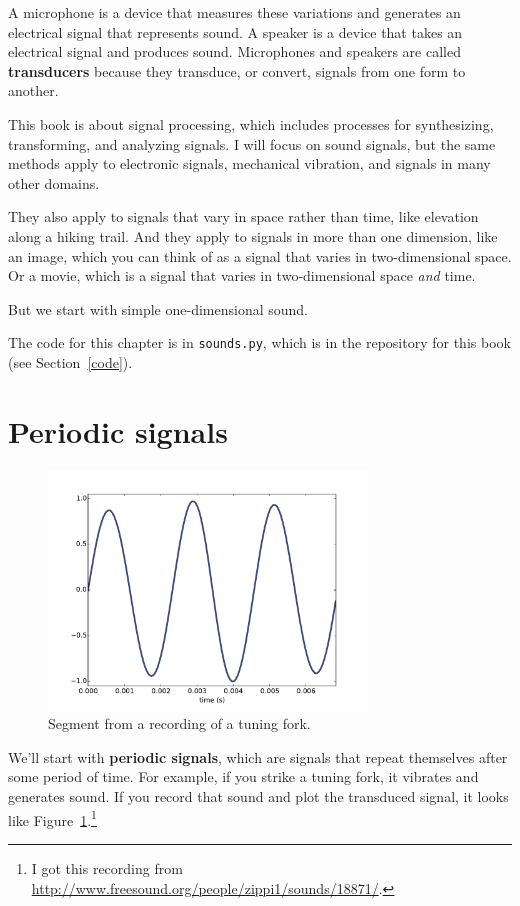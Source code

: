 \documentclass[12pt]{book}
\begin{document}
A microphone is a device that measures these variations and generates
an electrical signal that represents sound.  A speaker is a device
that takes an electrical signal and produces sound.
Microphones and speakers are called {\bf transducers} because they
transduce, or convert, signals from one form to another.

This book is about signal processing, which includes processes for
synthesizing, transforming, and analyzing signals.  I will focus on
sound signals, but the same methods apply to electronic signals,
mechanical vibration, and signals in many other domains.

They also apply to signals that vary in space rather than time, like
elevation along a hiking trail.  And they apply to signals in more
than one dimension, like an image, which you can think of as a signal
that varies in two-dimensional space.  Or a movie, which is
a signal that varies in two-dimensional space {\it and} time.

But we start with simple one-dimensional sound.

The code for this chapter is in {\tt sounds.py}, which is in the
repository for this book (see Section~\ref{code}).


\section{Periodic signals}

\begin{figure}
\centerline{\includegraphics[height=2.5in]{figs/tuning1.pdf}}
\caption{Segment from a recording of a tuning fork.}
\label{fig.tuning1}
\end{figure}

We'll start with {\bf periodic signals}, which are signals that
repeat themselves after some period of time.  For example, if you
strike a tuning fork, it vibrates and generates sound.  If you record
that sound and plot the transduced signal, it looks like
Figure~\ref{fig.tuning1}.\footnote{I got this recording from
  \url{http://www.freesound.org/people/zippi1/sounds/18871/}.}
\end{document}
